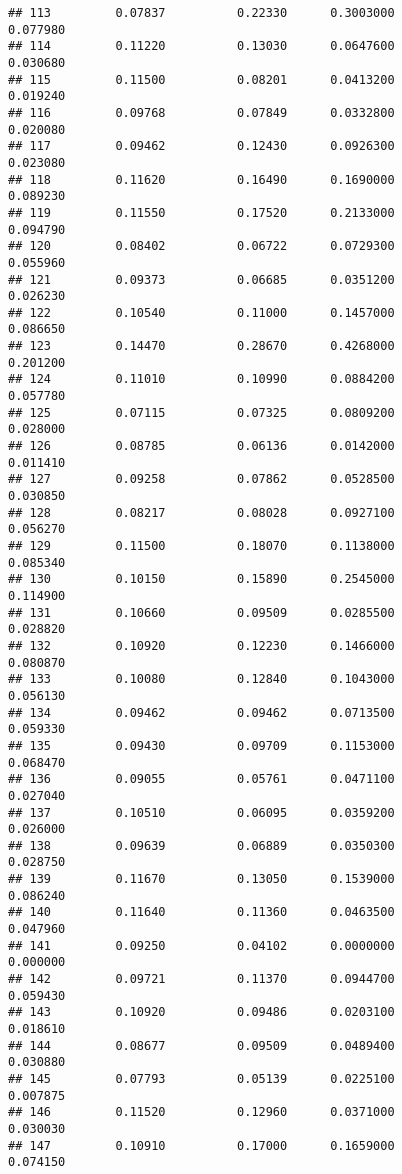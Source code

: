 \documentclass[
]{article}
\begin{document}
\begin{verbatim}
## 113         0.07837          0.22330      0.3003000            0.077980
## 114         0.11220          0.13030      0.0647600            0.030680
## 115         0.11500          0.08201      0.0413200            0.019240
## 116         0.09768          0.07849      0.0332800            0.020080
## 117         0.09462          0.12430      0.0926300            0.023080
## 118         0.11620          0.16490      0.1690000            0.089230
## 119         0.11550          0.17520      0.2133000            0.094790
## 120         0.08402          0.06722      0.0729300            0.055960
## 121         0.09373          0.06685      0.0351200            0.026230
## 122         0.10540          0.11000      0.1457000            0.086650
## 123         0.14470          0.28670      0.4268000            0.201200
## 124         0.11010          0.10990      0.0884200            0.057780
## 125         0.07115          0.07325      0.0809200            0.028000
## 126         0.08785          0.06136      0.0142000            0.011410
## 127         0.09258          0.07862      0.0528500            0.030850
## 128         0.08217          0.08028      0.0927100            0.056270
## 129         0.11500          0.18070      0.1138000            0.085340
## 130         0.10150          0.15890      0.2545000            0.114900
## 131         0.10660          0.09509      0.0285500            0.028820
## 132         0.10920          0.12230      0.1466000            0.080870
## 133         0.10080          0.12840      0.1043000            0.056130
## 134         0.09462          0.09462      0.0713500            0.059330
## 135         0.09430          0.09709      0.1153000            0.068470
## 136         0.09055          0.05761      0.0471100            0.027040
## 137         0.10510          0.06095      0.0359200            0.026000
## 138         0.09639          0.06889      0.0350300            0.028750
## 139         0.11670          0.13050      0.1539000            0.086240
## 140         0.11640          0.11360      0.0463500            0.047960
## 141         0.09250          0.04102      0.0000000            0.000000
## 142         0.09721          0.11370      0.0944700            0.059430
## 143         0.10920          0.09486      0.0203100            0.018610
## 144         0.08677          0.09509      0.0489400            0.030880
## 145         0.07793          0.05139      0.0225100            0.007875
## 146         0.11520          0.12960      0.0371000            0.030030
## 147         0.10910          0.17000      0.1659000            0.074150

\end{verbatim}
\end{document}
